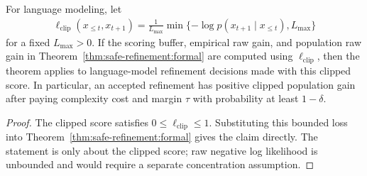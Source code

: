 \begin{corollary}
\label{cor:lm-clipped-refinement:formal}
For language modeling, let
\begin{align*}
\ell_{\mathrm{clip}}(x_{\le t},x_{t+1})
=
\frac{1}{L_{\max}}
\min\{-\log p(x_{t+1}\mid x_{\le t}),L_{\max}\}
\end{align*}
for a fixed $L_{\max}>0$. If the scoring buffer, empirical raw gain, and population raw gain in Theorem~\ref{thm:safe-refinement:formal} are computed using $\ell_{\mathrm{clip}}$, then the theorem applies to language-model refinement decisions made with this clipped score. In particular, an accepted refinement has positive clipped population gain after paying complexity cost and margin $\tau$ with probability at least $1-\delta$.
\end{corollary}
\begin{proof}
The clipped score satisfies $0\le \ell_{\mathrm{clip}}\le 1$. Substituting this bounded loss into Theorem~\ref{thm:safe-refinement:formal} gives the claim directly. The statement is only about the clipped score; raw negative log likelihood is unbounded and would require a separate concentration assumption.
\end{proof}

